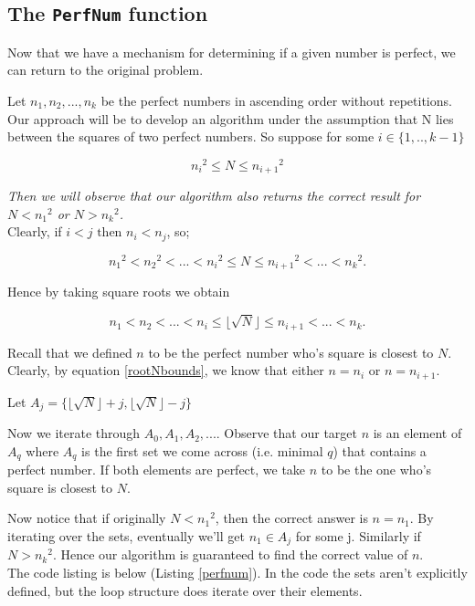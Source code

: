 \documentclass[10pt]{article}
\begin{document}
\subsection{The \texttt{PerfNum} function}

Now that we have a mechanism for determining if a given number is perfect, we can return to the original problem.

Let $n_1, n_2, ..., n_k$ be the perfect numbers in ascending order without repetitions. Our approach will be to develop an algorithm under the assumption that N lies between the squares of two perfect numbers. So suppose  for some $i \in \{ 1,..,k-1 \}$

$$ {n_i}^2 \leq N \leq {n_{i+1}}^2 $$

\emph{Then we will observe that our algorithm also returns the correct result for $N < {n_1}^2$ or $N > {n_k}^2$.} \\

Clearly, if $i<j \text{ then } n_i < n_j$, so;

$$ {n_1}^2 < {n_2}^2 < ... < {n_i} ^2 \leq N \leq {n_{i+1}}^2 < ... < {n_k}^2.$$

Hence by taking square roots we obtain

\begin{equation} \label{rootNbounds}
 n_1 < n_2 < ... <  n_i \leq \lfloor \sqrt{N} \rfloor \leq n_{i+1} < ... < n_k.
\end{equation}

Recall that we defined $n$ to be the perfect number who's square is closest to $N$. Clearly, by equation \ref{rootNbounds}, we know that either $n = n_i$ or $n = n_{i+1}$. 

Let $A_j =\{  \lfloor \sqrt{N} \rfloor + j,  \lfloor \sqrt{N} \rfloor  - j \} $

Now we iterate through $A_0, A_1, A_2,...$. Observe that our target $n$ is an element of $A_q$ where $A_q$ is the first set we come across (i.e. minimal $q$) that contains a perfect number. If both elements are perfect, we take $n$ to be the one who's square is closest to $N$.

Now notice that if originally $N < {n_1}^2$, then the correct answer is $n = n_1$. By iterating over the sets, eventually we'll get $n_1 \in A_j$ for some j. Similarly if $N > {n_k}^2$. Hence our algorithm is guaranteed to find the correct value of $n$. \\

The code listing is below (Listing \ref{perfnum}). In the code the sets aren't explicitly  defined, but the loop structure does iterate over their elements.
\end{document}
